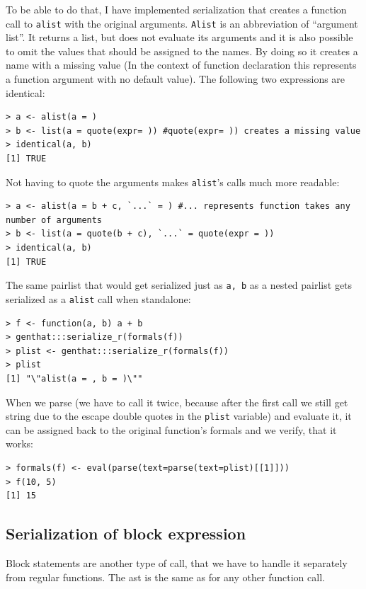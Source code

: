 \documentclass[thesis=B,english]{FITthesis}[2012/10/20]
\begin{document}
To be able to do that, I have implemented serialization that creates a function call to \verb|alist| with the original arguments. \verb|Alist| is an abbreviation of “argument list”. It returns a list, but does not evaluate its arguments and it is also possible to omit the values that should be assigned to the names. By doing so it creates a name with a missing value (In the context of function declaration this represents a function argument with no default value). The following two expressions are identical:

\begin{verbatim}
> a <- alist(a = )
> b <- list(a = quote(expr= )) #quote(expr= )) creates a missing value
> identical(a, b)
[1] TRUE
\end{verbatim}

Not having to quote the arguments makes \verb|alist|’s calls much more readable:

\begin{verbatim}
> a <- alist(a = b + c, `...` = ) #... represents function takes any number of arguments
> b <- list(a = quote(b + c), `...` = quote(expr = ))
> identical(a, b)
[1] TRUE
\end{verbatim}
The same pairlist that would get serialized just as \verb|a, b| as a nested pairlist gets serialized as a \verb|alist| call when standalone:
\begin{verbatim}
> f <- function(a, b) a + b
> genthat:::serialize_r(formals(f))
> plist <- genthat:::serialize_r(formals(f))
> plist
[1] "\"alist(a = , b = )\""
\end{verbatim}

When we parse (we have to call it twice, because after the first call we still get string due to the escape double quotes in the \verb|plist| variable) and evaluate it, it can be assigned back to the original function’s formals and we verify, that it works:

\begin{verbatim}
> formals(f) <- eval(parse(text=parse(text=plist)[[1]]))
> f(10, 5)
[1] 15

\end{verbatim}

\subsection{Serialization of block expression}
Block statements are another type of call, that we have to handle it separately from regular functions. The ast is the same as for any other function call.
\end{document}
